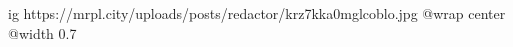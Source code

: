  
 
 
 
 

\ifcmt
  ig https://mrpl.city/uploads/posts/redactor/krz7kka0mglcoblo.jpg
  @wrap center
  @width 0.7
\fi
